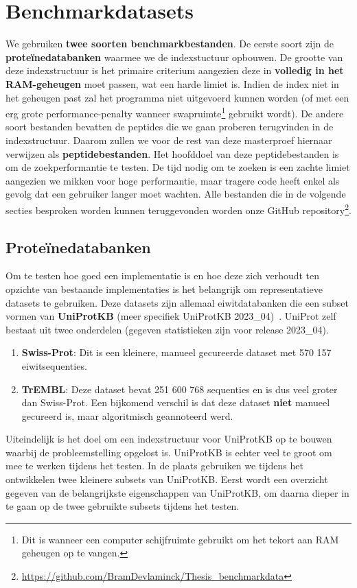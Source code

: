 \section{Benchmarkdatasets}\label{sec:datasets}
We gebruiken \textbf{twee soorten benchmarkbestanden}.
De eerste soort zijn de \textbf{proteïnedatabanken} waarmee we de indexstuctuur opbouwen.
De grootte van deze indexstructuur is het primaire criterium aangezien deze in \textbf{volledig in het RAM-geheugen} moet passen, wat een harde limiet is.
Indien de index niet in het geheugen past zal het programma niet uitgevoerd kunnen worden (of met een erg grote performance-penalty wanneer swapruimte\footnote{Dit is wanneer een computer schijfruimte gebruikt om het tekort aan RAM geheugen op te vangen.} gebruikt wordt).
De andere soort bestanden bevatten de peptides die we gaan proberen terugvinden in de indexstructuur.
Daarom zullen we voor de rest van deze masterproef hiernaar verwijzen als \textbf{peptidebestanden}.
Het hoofddoel van deze peptidebestanden is om de zoekperformantie te testen.
De tijd nodig om te zoeken is een zachte limiet aangezien we mikken voor hoge performantie, maar tragere code heeft enkel als gevolg dat een gebruiker langer moet wachten.
Alle bestanden die in de volgende secties besproken worden kunnen teruggevonden worden onze GitHub repository\footnote{\url{https://github.com/BramDevlaminck/Thesis_benchmarkdata}}.

\subsection{Proteïnedatabanken}\label{subsec:proteine-databanken}
Om te testen hoe goed een implementatie is en hoe deze zich verhoudt ten opzichte van bestaande implementaties is het belangrijk om representatieve datasets te gebruiken.
Deze datasets zijn allemaal eiwitdatabanken die een subset vormen van \textbf{UniProtKB} (meer specifiek UniProtKB 2023\_04)~\cite{UniprotKB}.
UniProt zelf bestaat uit twee onderdelen (gegeven statistieken zijn voor release 2023\_04).
\begin{enumerate}
    \item \textbf{Swiss-Prot}: Dit is een kleinere, manueel gecureerde dataset met 570 157 eiwitsequenties.
    \item \textbf{TrEMBL}: Deze dataset bevat 251 600 768 sequenties en is dus veel groter dan Swiss-Prot.
    Een bijkomend verschil is dat deze dataset \textbf{niet} manueel gecureerd is, maar algoritmisch geannoteerd werd.
\end{enumerate}
Uiteindelijk is het doel om een indexstructuur voor UniProtKB op te bouwen waarbij de probleemstelling opgelost is.
UniProtKB is echter veel te groot om mee te werken tijdens het testen.
In de plaats gebruiken we tijdens het ontwikkelen twee kleinere subsets van UniProtKB\@.
Eerst wordt een overzicht gegeven van de belangrijkste eigenschappen van UniProtKB, om daarna dieper in te gaan op de twee gebruikte subsets tijdens het testen.

